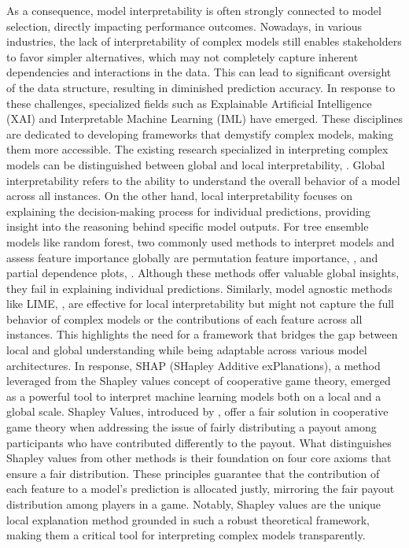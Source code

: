 \documentclass[12pt]{article}
\begin{document}
As a consequence, model interpretability is often strongly connected to model selection, directly impacting performance outcomes. Nowadays, in various industries, the lack of interpretability of complex models still enables stakeholders to favor simpler alternatives, which may not completely capture inherent dependencies and interactions in the data. 
This can lead to significant oversight of the data structure, resulting in diminished prediction accuracy. 
In response to these challenges, specialized fields such as Explainable Artificial Intelligence (XAI) and Interpretable Machine Learning (IML) have emerged.
These disciplines are dedicated to developing frameworks that demystify complex models, making them more accessible. 
The existing research specialized in interpreting complex models can be distinguished between global and local interpretability, \citep[Section~3.3]{molnar2022}. 
Global interpretability refers to the ability to understand the overall behavior of a model across all instances. On the other hand, local interpretability focuses on explaining the decision-making process for individual predictions, providing insight into the reasoning behind specific model outputs.
For tree ensemble models like random forest, two commonly used methods to interpret models and assess feature importance globally are permutation feature importance, \citep{article}, and partial dependence plots, \citep{4a848dd1-54e3-3c3c-83c3-04977ded2e71}. 
Although these methods offer valuable global insights, they fail in explaining individual predictions. 
Similarly, model agnostic methods like LIME, \citep{10.1145/2939672.2939778}, are effective for local interpretability but might not capture the full behavior of complex models or the contributions of each feature across all instances. 
This highlights the need for a framework that bridges the gap between local and global understanding while being adaptable across various model architectures. 
In response, SHAP (SHapley Additive exPlanations), a method leveraged from the Shapley values concept of cooperative game theory, emerged as a powerful tool to interpret machine learning models both on a local and a global scale.
Shapley Values, introduced by \citet{shapley:book1952}, offer a fair solution in cooperative game theory when addressing the issue of fairly distributing a payout among participants who have contributed differently to the payout.
What distinguishes Shapley values from other methods is their foundation on four core axioms that ensure a fair distribution.
These principles guarantee that the contribution of each feature to a model's prediction is allocated justly, mirroring the fair payout distribution among players in a game. Notably, Shapley values are the unique local explanation method grounded in such a robust theoretical framework, making them a critical tool for interpreting complex models transparently. 
\end{document}
